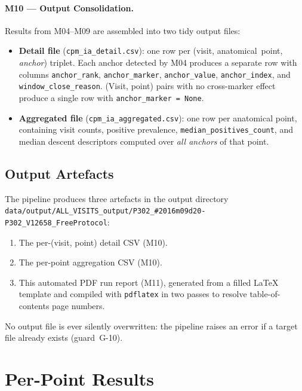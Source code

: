 \documentclass[a4paper,11pt]{article}
\begin{document}
\paragraph{M10 --- Output Consolidation.}
Results from M04--M09 are assembled into two tidy output files:
\begin{itemize}
  \item \textbf{Detail file} (\texttt{cpm\_ia\_detail.csv}): one row per
        (visit, anatomical~point, \emph{anchor}) triplet. Each anchor detected by M04
        produces a separate row with columns \texttt{anchor\_rank},
        \texttt{anchor\_marker}, \texttt{anchor\_value}, \texttt{anchor\_index},
        and \texttt{window\_close\_reason}.
        (Visit, point) pairs with no cross-marker effect produce a single row with
        \texttt{anchor\_marker = None}.
  \item \textbf{Aggregated file} (\texttt{cpm\_ia\_aggregated.csv}): one row per
        anatomical point, containing visit counts, positive prevalence,
        \texttt{median\_positives\_count}, and median descent descriptors computed over
        \emph{all anchors} of that point.
\end{itemize}

\subsection{Output Artefacts}

The pipeline produces three artefacts in the output directory \texttt{data/output/ALL\_VISITS\_output/P302\_\#2016m09d20-P302\_V12658\_FreeProtocol}:
\begin{enumerate}
  \item The per-(visit, point) detail CSV (M10).
  \item The per-point aggregation CSV (M10).
  \item This automated PDF run report (M11), generated from a filled \LaTeX{} template
        and compiled with \texttt{pdflatex} in two passes to resolve table-of-contents
        page numbers.
\end{enumerate}
No output file is ever silently overwritten: the pipeline raises an error if a target
file already exists (guard~G-10).

\section{Per-Point Results}
\end{document}
